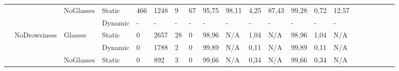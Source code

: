 \documentclass[12pt]{article}
\begin{document}
\begin{landscape}
\begin{table}[]
\begin{adjustbox}{width=1.4\textwidth}
\begin{tabular}{lllllllllllllllccllll}
				\multicolumn{1}{|l|}{} & \multicolumn{1}{l|}{} & \multicolumn{1}{l|}{\multirow{2}{*}{NoGlasses}} & \multicolumn{1}{l|}{Static}  & \multicolumn{1}{l|}{466} & \multicolumn{1}{l|}{1248} & \multicolumn{1}{l|}{9} & \multicolumn{1}{l|}{67} & \multicolumn{1}{l|}{95,75} & \multicolumn{1}{l|}{98,11} & \multicolumn{1}{l|}{4,25} & \multicolumn{1}{l|}{87,43} & \multicolumn{1}{l|}{99,28} & \multicolumn{1}{l|}{0,72} & \multicolumn{1}{l|}{12,57} & \multicolumn{1}{c|}{} & \multicolumn{1}{c|}{} & \multicolumn{1}{l|}{} & \multicolumn{1}{l|}{} & \multicolumn{1}{l|}{} & \multicolumn{1}{l|}{}\\ \cline{4-15}
				\multicolumn{1}{|l|}{} & \multicolumn{1}{l|}{} & \multicolumn{1}{l|}{} & \multicolumn{1}{l|}{Dynamic} & \multicolumn{1}{l|}{-} & \multicolumn{1}{l|}{-} & \multicolumn{1}{l|}{-} & \multicolumn{1}{l|}{-} & \multicolumn{1}{l|}{-} & \multicolumn{1}{l|}{-} & \multicolumn{1}{l|}{-} & \multicolumn{1}{l|}{-} & \multicolumn{1}{l|}{-} & \multicolumn{1}{l|}{-} & \multicolumn{1}{l|}{-} & \multicolumn{1}{c|}{} & \multicolumn{1}{c|}{} & \multicolumn{1}{l|}{} & \multicolumn{1}{l|}{} & \multicolumn{1}{l|}{} & \multicolumn{1}{l|}{} \\ \cline{2-15}
				\multicolumn{1}{|l|}{} & \multicolumn{1}{l|}{\multirow{4}{*}{NoDrowsiness}} & \multicolumn{1}{l|}{\multirow{2}{*}{Glasses}} & \multicolumn{1}{l|}{Static} & \multicolumn{1}{l|}{0} & \multicolumn{1}{l|}{2657} & \multicolumn{1}{l|}{28} & \multicolumn{1}{l|}{0} & \multicolumn{1}{l|}{98,96} & \multicolumn{1}{l|}{N/A} & \multicolumn{1}{l|}{1,04} & \multicolumn{1}{l|}{N/A} & \multicolumn{1}{l|}{98,96} & \multicolumn{1}{l|}{1,04} & \multicolumn{1}{l|}{N/A} & \multicolumn{1}{c|}{} & \multicolumn{1}{c|}{} & \multicolumn{1}{l|}{} & \multicolumn{1}{l|}{} & \multicolumn{1}{l|}{} & \multicolumn{1}{l|}{}\\ \cline{4-15}
				\multicolumn{1}{|l|}{} & \multicolumn{1}{l|}{} & \multicolumn{1}{l|}{} & \multicolumn{1}{l|}{Dynamic} & \multicolumn{1}{l|}{0} & \multicolumn{1}{l|}{1788} & \multicolumn{1}{l|}{2} & \multicolumn{1}{l|}{0} & \multicolumn{1}{l|}{99,89} & \multicolumn{1}{l|}{N/A} & \multicolumn{1}{l|}{0,11} & \multicolumn{1}{l|}{N/A} & \multicolumn{1}{l|}{99,89} & \multicolumn{1}{l|}{0,11} & \multicolumn{1}{l|}{N/A} & \multicolumn{1}{c|}{} & \multicolumn{1}{c|}{} & \multicolumn{1}{l|}{} & \multicolumn{1}{l|}{} & \multicolumn{1}{l|}{} & \multicolumn{1}{l|}{}\\ \cline{3-15}
				\multicolumn{1}{|l|}{} & \multicolumn{1}{l|}{} & \multicolumn{1}{l|}{\multirow{2}{*}{NoGlasses}} & \multicolumn{1}{l|}{Static} & \multicolumn{1}{l|}{0} & \multicolumn{1}{l|}{892} & \multicolumn{1}{l|}{3} & \multicolumn{1}{l|}{0} & \multicolumn{1}{l|}{99,66} & \multicolumn{1}{l|}{N/A} & \multicolumn{1}{l|}{0,34} & \multicolumn{1}{l|}{N/A} & \multicolumn{1}{l|}{99,66} & \multicolumn{1}{l|}{0,34} & \multicolumn{1}{l|}{N/A} & \multicolumn{1}{c|}{} & \multicolumn{1}{c|}{} & \multicolumn{1}{l|}{} & \multicolumn{1}{l|}{} & \multicolumn{1}{l|}{} & \multicolumn{1}{l|}{} \\ \cline{4-15}

\end{tabular}
\end{adjustbox}
\end{table}
\end{landscape}
\end{document}
